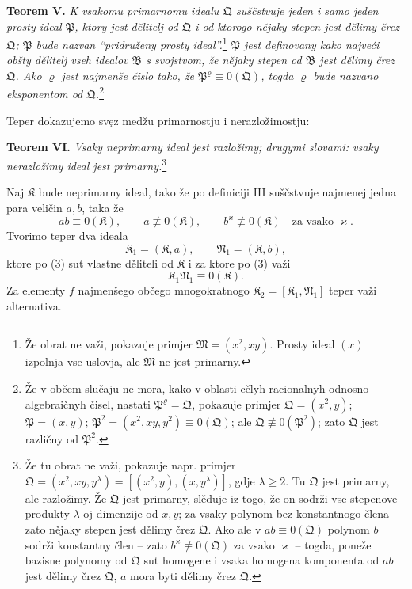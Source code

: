 \documentclass[11pt]{article}
\newcommand{\ideal}[1]{\mathfrak{#1}}
\begin{document}
\textbf{Teorem V.} \emph{K vsakomu primarnomu idealu \(\ideal Q\) suščstvuje jeden i samo jeden prosty ideal \(\ideal P\), ktory jest dělitelj od \(\ideal Q\) i od ktorogo nějaky stepen jest dělimy črez \(\ideal Q\); \(\ideal P\) bude nazvan ``pridruženy prosty ideal''.}\footnote{Že obrat ne važi, pokazuje primjer \(\ideal M=(x^2,xy)\). Prosty ideal \((x)\) izpolnja vse uslovja, ale \(\ideal M\) ne jest primarny.} \emph{\(\ideal P\) jest definovany kako najveći obšty dělitelj vseh idealov \(\ideal B\) s svojstvom, že nějaky stepen od \(\ideal B\) jest dělimy črez \(\ideal Q\). Ako \(\varrho\) jest najmenše čislo tako, že \(\ideal P^\varrho\equiv0(\ideal Q)\), togda \(\varrho\) bude nazvano eksponentom od \(\ideal Q\).}\footnote{Že v občem slučaju ne mora, kako v oblasti cělyh racionalnyh odnosno algebraičnyh čisel, nastati \(\ideal P^\varrho=\ideal Q\), pokazuje primjer \(\ideal Q=(x^2,y)\); \(\ideal P=(x,y)\); \(\ideal P^2=(x^2,xy,y^2)\equiv0(\ideal Q)\); ale \(\ideal Q\not\equiv0(\ideal P^2)\); zato \(\ideal Q\) jest različny od \(\ideal P^2\).}

Teper dokazujemo svęz medžu primarnostju i nerazložimostju:

\textbf{Teorem VI.} \emph{Vsaky neprimarny ideal jest razložimy; drugymi slovami: vsaky nerazložimy ideal jest primarny.}\footnote{Že tu obrat ne važi, pokazuje napr. primjer \(\ideal Q=(x^2,xy,y^\lambda)=[(x^2,y),(x,y^\lambda)]\), gdje \(\lambda\ge2\). Tu \(\ideal Q\) jest primarny, ale razložimy. Že \(\ideal Q\) jest primarny, slěduje iz togo, že on sodrži vse stepenove produkty \(\lambda\)-oj dimenzije od \(x,y\); za vsaky polynom bez konstantnogo člena zato nějaky stepen jest dělimy črez \(\ideal Q\). Ako ale v \(ab\equiv0(\ideal Q)\) polynom \(b\) sodrži konstantny člen -- zato \(b^\varkappa\not\equiv0(\ideal Q)\) za vsako \(\varkappa\) -- togda, poneže bazisne polynomy od \(\ideal Q\) sut homogene i vsaka homogena komponenta od \(ab\) jest dělimy črez \(\ideal Q\), \(a\) mora byti dělimy črez \(\ideal Q\).}

Naj \(\ideal K\) bude neprimarny ideal, tako že po definiciji III suščstvuje najmenej jedna para veličin \(a,b\), taka že
\begin{equation}
 a b\equiv0(\ideal K),\qquad
 a\not\equiv0(\ideal K),\qquad
 b^\varkappa\not\equiv0(\ideal K)\quad\text{za vsako }\varkappa.
\tag{3}
\end{equation}
Tvorimo teper dva ideala
\[
 \ideal K_1=(\ideal K,a),\qquad \ideal N_1=(\ideal K,b),
\]
ktore po (3) sut vlastne děliteli od \(\ideal K\) i za ktore po (3) važi
\begin{equation}
 \ideal K_1\ideal N_1\equiv0(\ideal K).
\tag{4}
\end{equation}
Za elementy \(f\) najmenšego občego mnogokratnogo \(\ideal K_2=[\ideal K_1,\ideal N_1]\) teper važi alternativa.
\end{document}

